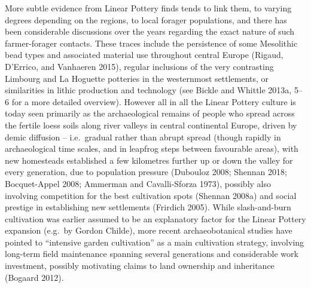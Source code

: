 \documentclass[
  12pt,
  a4paper, twoside]{book}
\begin{document}
More subtle evidence from Linear Pottery finds tends to link them, to varying degrees depending on the regions, to local forager populations, and there has been considerable discussions over the years regarding the exact nature of such farmer-forager contacts. These traces include the persistence of some Mesolithic bead types and associated material use throughout central Europe (Rigaud, D'Errico, and Vanhaeren 2015), regular inclusions of the very contrasting Limbourg and La Hoguette potteries in the westernmost settlements, or similarities in lithic production and technology (see Bickle and Whittle 2013a, 5--6 for a more detailed overview). However all in all the Linear Pottery culture is today seen primarily as the archaeological remains of people who spread across the fertile loess soils along river valleys in central continental Europe, driven by demic diffusion -- i.e.~gradual rather than abrupt spread (though rapidly in archaeological time scales, and in leapfrog steps between favourable areas), with new homesteads established a few kilometres further up or down the valley for every generation, due to population pressure (Dubouloz 2008; Shennan 2018; Bocquet-Appel 2008; Ammerman and Cavalli-Sforza 1973), possibly also involving competition for the best cultivation spots (Shennan 2008a) and social prestige in establishing new settlements (Frirdich 2005). While slash-and-burn cultivation was earlier assumed to be an explanatory factor for the Linear Pottery expansion (e.g.~by Gordon Childe), more recent archaeobotanical studies have pointed to ``intensive garden cultivation'' as a main cultivation strategy, involving long-term field maintenance spanning several generations and considerable work investment, possibly motivating claims to land ownership and inheritance (Bogaard 2012).
\end{document}
